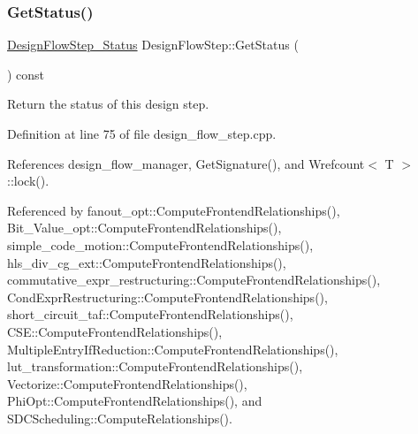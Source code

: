 \subsubsection{\texorpdfstring{Get\+Status()}{GetStatus()}}
{\footnotesize\ttfamily \hyperlink{design__flow__step_8hpp_afb1f0d73069c26076b8d31dbc8ebecdf}{Design\+Flow\+Step\+\_\+\+Status} Design\+Flow\+Step\+::\+Get\+Status (\begin{DoxyParamCaption}{ }\end{DoxyParamCaption}) const}



Return the status of this design step. 



Definition at line 75 of file design\+\_\+flow\+\_\+step.\+cpp.



References design\+\_\+flow\+\_\+manager, Get\+Signature(), and Wrefcount$<$ T $>$\+::lock().



Referenced by fanout\+\_\+opt\+::\+Compute\+Frontend\+Relationships(), Bit\+\_\+\+Value\+\_\+opt\+::\+Compute\+Frontend\+Relationships(), simple\+\_\+code\+\_\+motion\+::\+Compute\+Frontend\+Relationships(), hls\+\_\+div\+\_\+cg\+\_\+ext\+::\+Compute\+Frontend\+Relationships(), commutative\+\_\+expr\+\_\+restructuring\+::\+Compute\+Frontend\+Relationships(), Cond\+Expr\+Restructuring\+::\+Compute\+Frontend\+Relationships(), short\+\_\+circuit\+\_\+taf\+::\+Compute\+Frontend\+Relationships(), C\+S\+E\+::\+Compute\+Frontend\+Relationships(), Multiple\+Entry\+If\+Reduction\+::\+Compute\+Frontend\+Relationships(), lut\+\_\+transformation\+::\+Compute\+Frontend\+Relationships(), Vectorize\+::\+Compute\+Frontend\+Relationships(), Phi\+Opt\+::\+Compute\+Frontend\+Relationships(), and S\+D\+C\+Scheduling\+::\+Compute\+Relationships().

